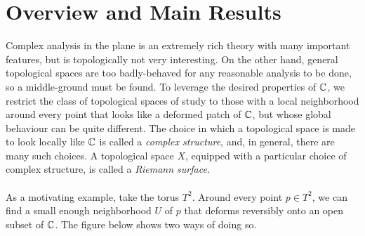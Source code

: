 \documentclass[../Moduli_Spaces_of_Riemann_Surfaces.tex]{subfiles}
\begin{document}
    \section{Overview and Main Results}
    Complex analysis in the plane is an extremely rich theory with many important features, but is topologically not very interesting. On the other hand, general topological spaces are too badly-behaved for any reasonable analysis to be done, so a middle-ground must be found. To leverage the desired properties of $\mathbb{C}$, we restrict the class of topological spaces of study to those with a local neighborhood around every point that looks like a deformed patch of $\mathbb{C}$, but whose global behaviour can be quite different. The choice in which a topological space is made to look locally like $\mathbb{C}$ is called a \textit{complex structure}, and, in general, there are many such choices. A topological space $X$, equipped with a particular choice of complex structure, is called a \textit{Riemann surface}.\\\ \\
    As a motivating example, take the torus $T^2$. Around every point $p\in T^2$, we can find a small enough neighborhood $U$ of $p$ that deforms reversibly onto an open subset of $\mathbb{C}$. The figure below shows two ways of doing so.
\end{document}
